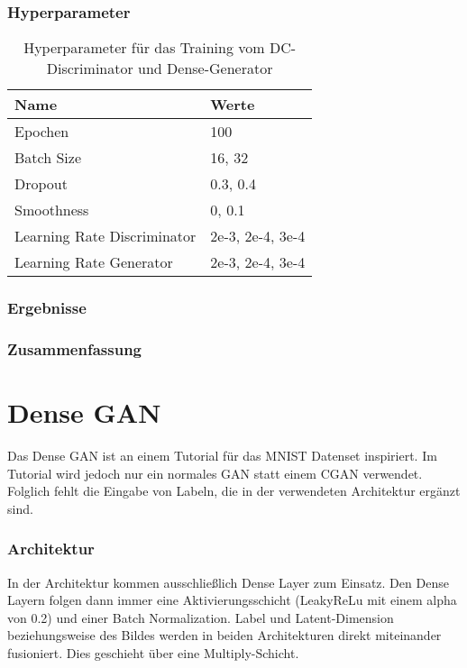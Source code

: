 \subsubsection{Hyperparameter}
\begin{table}[H]
	\centering
	\begin{tabular}{l l}
		Name                        & Werte            \\ \hline
		Epochen                     & 100              \\
		Batch Size                  & 16, 32           \\
		Dropout                     & 0.3, 0.4         \\
		Smoothness                  & 0, 0.1           \\
		Learning Rate Discriminator & 2e-3, 2e-4, 3e-4 \\
		Learning Rate Generator     & 2e-3, 2e-4, 3e-4
	\end{tabular}
	\caption{Hyperparameter für das Training vom DC-Discriminator und Dense-Generator}
\end{table}
\subsubsection{Ergebnisse}
\subsubsection{Zusammenfassung}

\section{Dense GAN}
\label{section:dense-gan}
Das Dense GAN ist an einem Tutorial für das MNIST Datenset inspiriert.
Im Tutorial wird jedoch nur ein normales GAN statt einem CGAN verwendet.
Folglich fehlt die Eingabe von Labeln, die in der verwendeten Architektur ergänzt sind.

\subsubsection{Architektur}
In der Architektur kommen ausschließlich Dense Layer zum Einsatz.
Den Dense Layern folgen dann immer eine Aktivierungsschicht (LeakyReLu mit einem alpha von 0.2) und einer Batch Normalization.
Label und Latent-Dimension beziehungsweise des Bildes werden in beiden Architekturen direkt miteinander fusioniert.
Dies geschieht über eine Multiply-Schicht.

